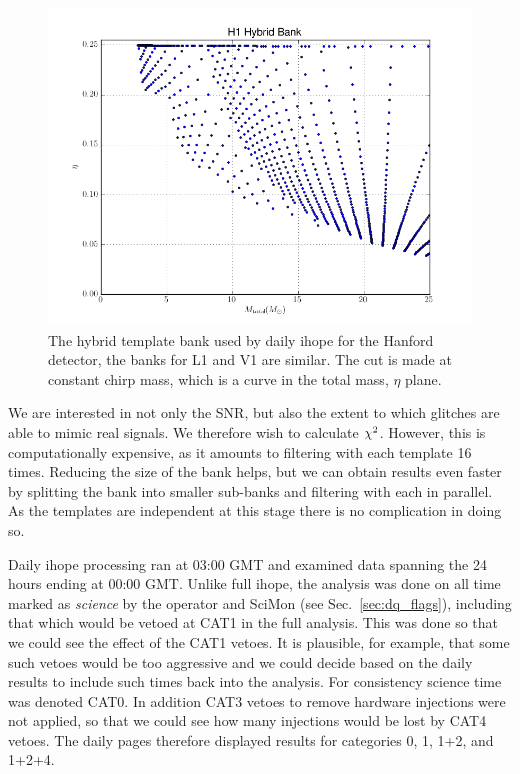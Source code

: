 \begin{figure}
  \includegraphics[width=\linewidth]{figures/detchar/hybrid_bank.png}
  \caption[The hybrid template bank used by daily ihope]{
  \label{f:daily_ihope_bank}
The hybrid template bank used by daily ihope for the Hanford detector,
the banks for L1 and V1 are similar.
The cut is made at constant chirp mass, which is
a curve in the total mass, $\eta$ plane.}
\end{figure}%

We are interested in not only the SNR, but also the extent to which
glitches are able to mimic real signals.  We therefore wish to
calculate $\chi^2$.  However, this is computationally expensive, as it
amounts to filtering with each template 16 times.  Reducing the size
of the bank helps, but we can obtain results even faster by splitting
the bank into smaller sub-banks and filtering with each in parallel.
As the templates are independent at this stage there is no
complication in doing so.

Daily ihope processing ran at 03:00 GMT and examined data spanning the
24 hours ending at 00:00 GMT.  Unlike full ihope, the analysis was
done on all time marked as \emph{science} by the operator and SciMon
(see Sec.~\ref{sec:dq_flags}), including that which would be vetoed at
CAT1 in the full analysis.  This was done so that we could see the
effect of the CAT1 vetoes.  It is plausible, for example, that some
such vetoes would be too aggressive and we could decide based on the
daily results to include such times back into the analysis.  For
consistency science time was denoted CAT0.  In addition CAT3 vetoes
to remove hardware injections were not applied, so that we could see
how many injections would be lost by CAT4 vetoes.  The daily pages
therefore displayed results for categories 0, 1, 1+2, and 1+2+4.

